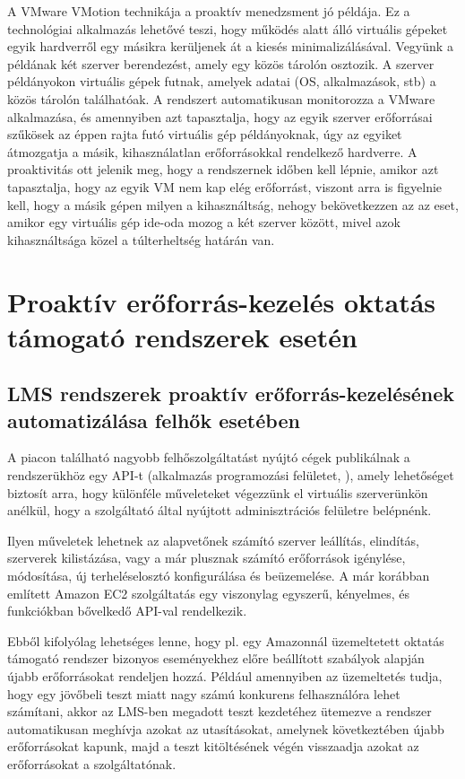 A VMware VMotion technikája a proaktív menedzsment jó példája. Ez a technológiai alkalmazás lehetővé teszi, hogy működés alatt álló virtuális gépeket egyik hardverről egy másikra kerüljenek át a kiesés minimalizálásával. Vegyünk a példának két szerver berendezést, amely egy közös tárolón osztozik. A szerver példányokon virtuális gépek futnak, amelyek adatai (OS, alkalmazások, stb) a közös tárolón találhatóak. A rendszert automatikusan monitorozza a VMware alkalmazása, és amennyiben azt tapasztalja, hogy az egyik szerver erőforrásai szűkösek az éppen rajta futó virtuális gép példányoknak, úgy az egyiket átmozgatja a másik, kihasználatlan erőforrásokkal rendelkező hardverre.
A proaktivitás ott jelenik meg, hogy a rendszernek időben kell lépnie, amikor azt tapasztalja, hogy az egyik VM nem kap elég erőforrást, viszont arra is figyelnie kell, hogy a másik gépen milyen a kihasználtság, nehogy bekövetkezzen az az eset, amikor egy virtuális gép ide-oda mozog a két szerver között, mivel azok kihasználtsága közel a túlterheltség határán van.

\section{Proaktív erőforrás-kezelés oktatás támogató rendszerek esetén}

\subsection{LMS rendszerek proaktív erőforrás-kezelésének automatizálása felhők esetében}

A piacon található nagyobb felhőszolgáltatást nyújtó cégek publikálnak a rendszerükhöz egy API-t (alkalmazás programozási felületet, ), amely lehetőséget biztosít arra, hogy különféle műveleteket végezzünk el virtuális szerverünkön anélkül, hogy a szolgáltató által nyújtott adminisztrációs felületre belépnénk.

Ilyen műveletek lehetnek az alapvetőnek számító szerver leállítás, elindítás, szerverek kilistázása, vagy a már plusznak számító erőforrások igénylése, módosítása, új terheléselosztó konfigurálása és beüzemelése. A már korábban említett Amazon EC2 szolgáltatás egy viszonylag egyszerű, kényelmes, és funkciókban bővelkedő API-val rendelkezik.

Ebből kifolyólag lehetséges lenne, hogy pl. egy Amazonnál üzemeltetett oktatás támogató rendszer bizonyos eseményekhez előre beállított szabályok alapján újabb erőforrásokat rendeljen hozzá. Például amennyiben az üzemeltetés tudja, hogy egy jövőbeli teszt miatt nagy számú konkurens felhasználóra lehet számítani, akkor az LMS-ben megadott teszt kezdetéhez ütemezve a rendszer automatikusan meghívja azokat az utasításokat, amelynek következtében újabb erőforrásokat kapunk, majd a teszt kitöltésének végén visszaadja azokat az erőforrásokat a szolgáltatónak.

